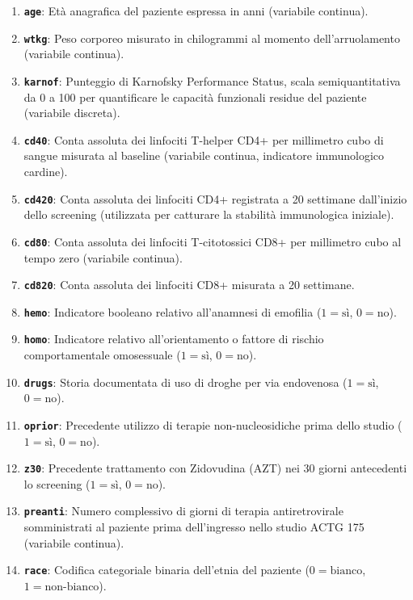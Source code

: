 \documentclass{article}
\begin{document}
\begin{enumerate}
    \item \textbf{\texttt{age}}: Età anagrafica del paziente espressa in anni (variabile continua).
    \item \textbf{\texttt{wtkg}}: Peso corporeo misurato in chilogrammi al momento dell'arruolamento (variabile continua).
    \item \textbf{\texttt{karnof}}: Punteggio di Karnofsky Performance Status, scala semiquantitativa da 0 a 100 per quantificare le capacità funzionali residue del paziente (variabile discreta).
    \item \textbf{\texttt{cd40}}: Conta assoluta dei linfociti T-helper CD4+ per millimetro cubo di sangue misurata al baseline (variabile continua, indicatore immunologico cardine).
    \item \textbf{\texttt{cd420}}: Conta assoluta dei linfociti CD4+ registrata a 20 settimane dall'inizio dello screening (utilizzata per catturare la stabilità immunologica iniziale).
    \item \textbf{\texttt{cd80}}: Conta assoluta dei linfociti T-citotossici CD8+ per millimetro cubo al tempo zero (variabile continua).
    \item \textbf{\texttt{cd820}}: Conta assoluta dei linfociti CD8+ misurata a 20 settimane.
    \item \textbf{\texttt{hemo}}: Indicatore booleano relativo all'anamnesi di emofilia ($1 = \text{sì}$, $0 = \text{no}$).
    \item \textbf{\texttt{homo}}: Indicatore relativo all'orientamento o fattore di rischio comportamentale omosessuale ($1 = \text{sì}$, $0 = \text{no}$).
    \item \textbf{\texttt{drugs}}: Storia documentata di uso di droghe per via endovenosa ($1 = \text{sì}$, $0 = \text{no}$).
    \item \textbf{\texttt{oprior}}: Precedente utilizzo di terapie non-nucleosidiche prima dello studio ($1 = \text{sì}$, $0 = \text{no}$).
    \item \textbf{\texttt{z30}}: Precedente trattamento con Zidovudina (AZT) nei 30 giorni antecedenti lo screening ($1 = \text{sì}$, $0 = \text{no}$).
    \item \textbf{\texttt{preanti}}: Numero complessivo di giorni di terapia antiretrovirale somministrati al paziente prima dell'ingresso nello studio ACTG 175 (variabile continua).
    \item \textbf{\texttt{race}}: Codifica categoriale binaria dell'etnia del paziente ($0 = \text{bianco}$, $1 = \text{non-bianco}$).

\end{enumerate}
\end{document}
